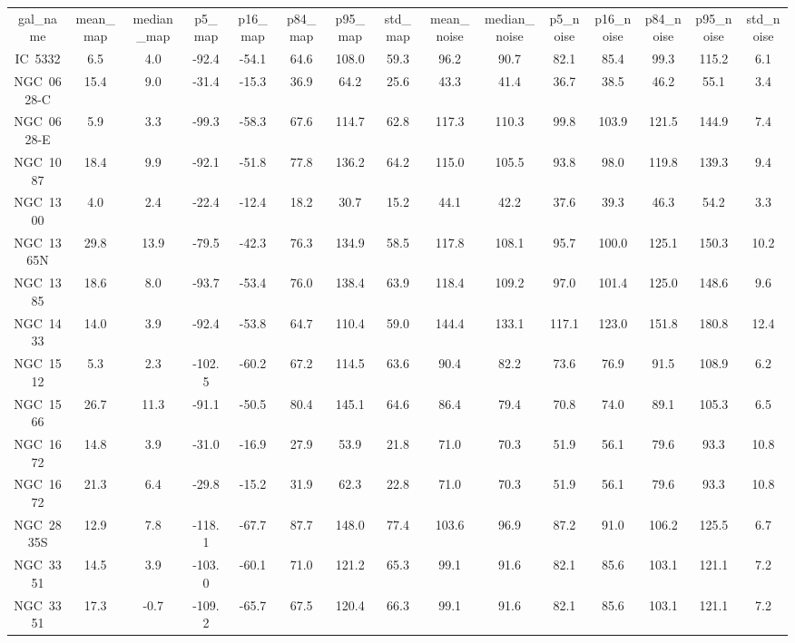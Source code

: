 \begin{table}
\begin{tabular}{ccccccccccccccc}
gal_name & mean_map & median_map & p5_map & p16_map & p84_map & p95_map & std_map & mean_noise & median_noise & p5_noise & p16_noise & p84_noise & p95_noise & std_noise \\
IC~5332 & 6.5 & 4.0 & -92.4 & -54.1 & 64.6 & 108.0 & 59.3 & 96.2 & 90.7 & 82.1 & 85.4 & 99.3 & 115.2 & 6.1 \\
NGC~0628-C & 15.4 & 9.0 & -31.4 & -15.3 & 36.9 & 64.2 & 25.6 & 43.3 & 41.4 & 36.7 & 38.5 & 46.2 & 55.1 & 3.4 \\
NGC~0628-E & 5.9 & 3.3 & -99.3 & -58.3 & 67.6 & 114.7 & 62.8 & 117.3 & 110.3 & 99.8 & 103.9 & 121.5 & 144.9 & 7.4 \\
NGC~1087 & 18.4 & 9.9 & -92.1 & -51.8 & 77.8 & 136.2 & 64.2 & 115.0 & 105.5 & 93.8 & 98.0 & 119.8 & 139.3 & 9.4 \\
NGC~1300 & 4.0 & 2.4 & -22.4 & -12.4 & 18.2 & 30.7 & 15.2 & 44.1 & 42.2 & 37.6 & 39.3 & 46.3 & 54.2 & 3.3 \\
NGC~1365N & 29.8 & 13.9 & -79.5 & -42.3 & 76.3 & 134.9 & 58.5 & 117.8 & 108.1 & 95.7 & 100.0 & 125.1 & 150.3 & 10.2 \\
NGC~1385 & 18.6 & 8.0 & -93.7 & -53.4 & 76.0 & 138.4 & 63.9 & 118.4 & 109.2 & 97.0 & 101.4 & 125.0 & 148.6 & 9.6 \\
NGC~1433 & 14.0 & 3.9 & -92.4 & -53.8 & 64.7 & 110.4 & 59.0 & 144.4 & 133.1 & 117.1 & 123.0 & 151.8 & 180.8 & 12.4 \\
NGC~1512 & 5.3 & 2.3 & -102.5 & -60.2 & 67.2 & 114.5 & 63.6 & 90.4 & 82.2 & 73.6 & 76.9 & 91.5 & 108.9 & 6.2 \\
NGC~1566 & 26.7 & 11.3 & -91.1 & -50.5 & 80.4 & 145.1 & 64.6 & 86.4 & 79.4 & 70.8 & 74.0 & 89.1 & 105.3 & 6.5 \\
NGC~1672 & 14.8 & 3.9 & -31.0 & -16.9 & 27.9 & 53.9 & 21.8 & 71.0 & 70.3 & 51.9 & 56.1 & 79.6 & 93.3 & 10.8 \\
NGC~1672 & 21.3 & 6.4 & -29.8 & -15.2 & 31.9 & 62.3 & 22.8 & 71.0 & 70.3 & 51.9 & 56.1 & 79.6 & 93.3 & 10.8 \\
NGC~2835S & 12.9 & 7.8 & -118.1 & -67.7 & 87.7 & 148.0 & 77.4 & 103.6 & 96.9 & 87.2 & 91.0 & 106.2 & 125.5 & 6.7 \\
NGC~3351 & 14.5 & 3.9 & -103.0 & -60.1 & 71.0 & 121.2 & 65.3 & 99.1 & 91.6 & 82.1 & 85.6 & 103.1 & 121.1 & 7.2 \\
NGC~3351 & 17.3 & -0.7 & -109.2 & -65.7 & 67.5 & 120.4 & 66.3 & 99.1 & 91.6 & 82.1 & 85.6 & 103.1 & 121.1 & 7.2 \\

\end{tabular}
\end{table}
